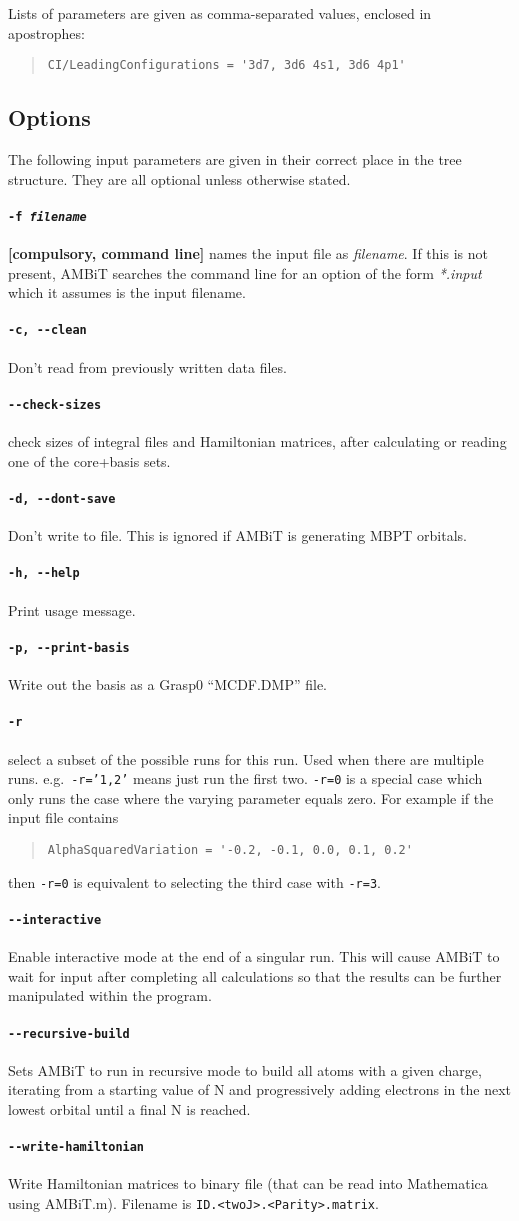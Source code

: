 \documentclass[a4paper,11pt]{article}
\newcommand{\option}[1]{\paragraph{\texttt{#1}}}
\newcommand{\code}[1]{\texttt{#1}}
\begin{document}
Lists of parameters are given as comma-separated values, enclosed in apostrophes:
\begin{quote}
\begin{verbatim}
CI/LeadingConfigurations = '3d7, 3d6 4s1, 3d6 4p1'
\end{verbatim}
\end{quote}

\subsection{Options}
The following input parameters are given in their correct place in the tree structure. They are all optional unless otherwise stated.

\option{-f \emph{filename}} \textbf{[compulsory, command line]} names the input file as \emph{filename}. If this is not present, AMBiT searches the command line for an option of the form \emph{*.input} which it assumes is the input filename. 

\option{-c, -{}-clean} Don't read from previously written data files.
\option{-{}-check-sizes} check sizes of integral files and Hamiltonian matrices, after calculating or reading one of the core+basis sets.
\option{-d, -{}-dont-save} Don't write to file. This is ignored if AMBiT is generating MBPT orbitals.

\option{-h, -{}-help} Print usage message.

\option{-p, -{}-print-basis} Write out the basis as a Grasp0 ``MCDF.DMP'' file.

\option{-r} select a subset of the possible runs for this run. Used when there are multiple runs. e.g.~\texttt{-r='1,2'} means just run the first two. \texttt{-r=0} is a special case which only runs the case where the varying parameter equals zero. For example if the input file contains

\begin{quote}
\begin{verbatim}
AlphaSquaredVariation = '-0.2, -0.1, 0.0, 0.1, 0.2'
\end{verbatim}
\end{quote}
then \texttt{-r=0} is equivalent to selecting the third case with \texttt{-r=3}.

\option{-{}-interactive} Enable interactive mode at the end of a singular run. This will cause AMBiT to wait for input after completing all calculations so that the results can be further manipulated within the program.
\option{-{}-recursive-build} Sets AMBiT to run in recursive mode to build all atoms with a given charge, iterating from a starting value of N and progressively adding electrons in the next lowest orbital until a final N is reached.
\option{-{}-write-hamiltonian} Write Hamiltonian matrices to binary file (that can be read into Mathematica using AMBiT.m). Filename is \code{ID.<twoJ>.<Parity>.matrix}.
\end{document}
